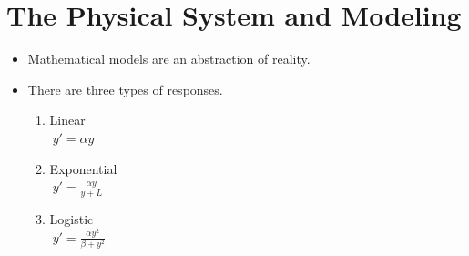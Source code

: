 
\section{The Physical System and Modeling}
\begin{frame}
  \begin{itemize}
	\item Mathematical models are an abstraction of reality.
	\item There are three types of responses. 
	\begin{enumerate}
		\item Linear\\
		$\ y'=\alpha y$
		\item Exponential\\
		$\ y' = \frac{\alpha y}{y+ L}$ 
		\item Logistic\\
		$\ y'= \frac {\alpha y^2}{\beta + y^2}$
	\end{enumerate}
  \end{itemize}
\end{frame}

